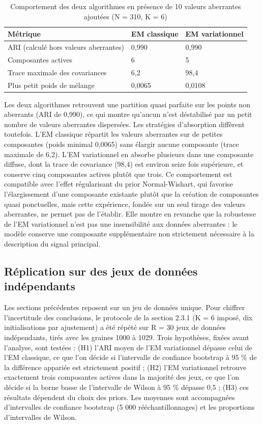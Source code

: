 \begin{table}[H]
\centering
\small
\setlength{\tabcolsep}{0.14cm}
\begin{tabular}{|p{4.84cm}|p{4.84cm}|p{4.84cm}|}
\hline
\textbf{Métrique} & \textbf{EM classique} & \textbf{EM variationnel} \\
\hline
ARI (calculé hors valeurs aberrantes) & 0,990 & 0,990 \\
\hline
Composantes actives & 6 & 5 \\
\hline
Trace maximale des covariances & 6,2 & 98,4 \\
\hline
Plus petit poids de mélange & 0,0065 & 0,0108 \\
\hline
\end{tabular}
\caption{Comportement des deux algorithmes en présence de 10 valeurs aberrantes ajoutées (N = 310, K = 6)}
\label{tab:2_14}
\end{table}
Les deux algorithmes retrouvent une partition quasi parfaite sur les points non aberrants (ARI de 0,990), ce qui montre qu'aucun n'est déstabilisé par un petit nombre de valeurs aberrantes dispersées. Les stratégies d'absorption diffèrent toutefois. L'EM classique répartit les valeurs aberrantes sur de petites composantes (poids minimal 0,0065) sans élargir aucune composante (trace maximale de 6,2). L'EM variationnel en absorbe plusieurs dans une composante diffuse, dont la trace de covariance (98,4) est environ seize fois supérieure, et conserve cinq composantes actives plutôt que trois. Ce comportement est compatible avec l'effet régularisant du prior Normal-Wishart, qui favorise l'élargissement d'une composante existante plutôt que la création de composantes quasi ponctuelles, mais cette expérience, fondée sur un seul tirage des valeurs aberrantes, ne permet pas de l'établir. Elle montre en revanche que la robustesse de l'EM variationnel n'est pas une insensibilité aux données aberrantes : le modèle conserve une composante supplémentaire non strictement nécessaire à la description du signal principal.

\subsection{Réplication sur des jeux de données indépendants}
Les sections précédentes reposent sur un jeu de données unique. Pour chiffrer l'incertitude des conclusions, le protocole de la section 2.3.1 (K = 6 imposé, dix initialisations par ajustement) a été répété sur R = 30 jeux de données indépendants, tirés avec les graines 1000 à 1029. Trois hypothèses, fixées avant l'analyse, sont testées : (H1) l'ARI moyen de l'EM variationnel dépasse celui de l'EM classique, ce que l'on décide si l'intervalle de confiance bootstrap à 95 \% de la différence appariée est strictement positif ; (H2) l'EM variationnel retrouve exactement trois composantes actives dans la majorité des jeux, ce que l'on décide si la borne basse de l'intervalle de Wilson à 95 \% dépasse 0,5 ; (H3) ces résultats dépendent du choix des priors. Les moyennes sont accompagnées d'intervalles de confiance bootstrap (5 000 rééchantillonnages) et les proportions d'intervalles de Wilson.

